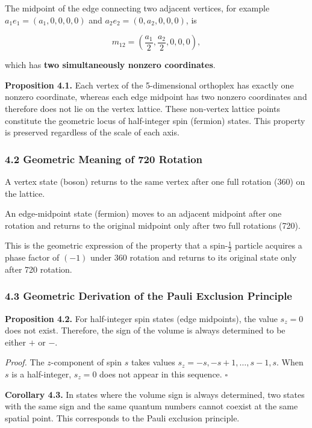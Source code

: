 \documentclass[a4paper,11pt]{article}
\begin{document}
The midpoint of the edge connecting two adjacent vertices, for example $a_1 e_1 = (a_1, 0, 0, 0, 0)$ and $a_2 e_2 = (0, a_2, 0, 0, 0)$, is

\[m_{12} = \left(\frac{a_1}{2}, \frac{a_2}{2}, 0, 0, 0\right),\]

which has \textbf{two simultaneously nonzero coordinates}.

\textbf{Proposition 4.1.} Each vertex of the 5-dimensional orthoplex has exactly one nonzero coordinate, whereas each edge midpoint has two nonzero coordinates and therefore does not lie on the vertex lattice. These non-vertex lattice points constitute the geometric locus of half-integer spin (fermion) states. This property is preserved regardless of the scale of each axis.

\subsubsection*{4.2 Geometric Meaning of 720\textdegree{} Rotation}

A vertex state (boson) returns to the same vertex after one full rotation (360\textdegree) on the lattice.

An edge-midpoint state (fermion) moves to an adjacent midpoint after one rotation and returns to the original midpoint only after two full rotations (720\textdegree).

This is the geometric expression of the property that a spin-$\frac{1}{2}$ particle acquires a phase factor of $(-1)$ under 360\textdegree{} rotation and returns to its original state only after 720\textdegree{} rotation.

\subsubsection*{4.3 Geometric Derivation of the Pauli Exclusion Principle}

\textbf{Proposition 4.2.} For half-integer spin states (edge midpoints), the value $s_z = 0$ does not exist. Therefore, the sign of the volume is always determined to be either $+$ or $-$.

\emph{Proof.} The $z$-component of spin $s$ takes values $s_z = -s, -s+1, \ldots, s-1, s$. When $s$ is a half-integer, $s_z = 0$ does not appear in this sequence. $\square$

\textbf{Corollary 4.3.} In states where the volume sign is always determined, two states with the same sign and the same quantum numbers cannot coexist at the same spatial point. This corresponds to the Pauli exclusion principle.
\end{document}
